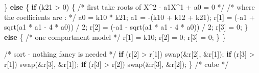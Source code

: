 \documentclass[
  letterpaper,
  DIV=11,
  numbers=noendperiod]{scrartcl}
\newenvironment{Shaded}{\begin{snugshade}}{\end{snugshade}}
\newcommand{\CommentTok}[1]{\textcolor[rgb]{0.37,0.37,0.37}{#1}}
\newcommand{\ControlFlowTok}[1]{\textcolor[rgb]{0.00,0.23,0.31}{\textbf{#1}}}
\newcommand{\DecValTok}[1]{\textcolor[rgb]{0.68,0.00,0.00}{#1}}
\newcommand{\NormalTok}[1]{\textcolor[rgb]{0.00,0.23,0.31}{#1}}
\newcommand{\OperatorTok}[1]{\textcolor[rgb]{0.37,0.37,0.37}{#1}}
\begin{document}
\begin{Shaded}
\begin{Highlighting}[]
        \OperatorTok{\}}
    \ControlFlowTok{else}
        \OperatorTok{\{}
        \ControlFlowTok{if} \OperatorTok{(}\NormalTok{k21 }\OperatorTok{\textgreater{}} \DecValTok{0}\OperatorTok{)}
            \OperatorTok{\{}
            \CommentTok{/* first take roots of X\^{}2 {-} a1X\^{}1 + a0 = 0 */}
            \CommentTok{/* where the coefficients are : */}
\NormalTok{            a0 }\OperatorTok{=}\NormalTok{ k10 }\OperatorTok{*}\NormalTok{ k21}\OperatorTok{;}
\NormalTok{            a1 }\OperatorTok{=} \OperatorTok{{-}(}\NormalTok{k10 }\OperatorTok{+}\NormalTok{ k12 }\OperatorTok{+}\NormalTok{ k21}\OperatorTok{);}
\NormalTok{            r}\OperatorTok{[}\DecValTok{1}\OperatorTok{]} \OperatorTok{=} \OperatorTok{({-}}\NormalTok{a1 }\OperatorTok{+}\NormalTok{ sqrt}\OperatorTok{(}\NormalTok{a1 }\OperatorTok{*}\NormalTok{ a1 }\OperatorTok{{-}} \DecValTok{4} \OperatorTok{*}\NormalTok{ a0}\OperatorTok{))} \OperatorTok{/} \DecValTok{2}\OperatorTok{;}
\NormalTok{            r}\OperatorTok{[}\DecValTok{2}\OperatorTok{]} \OperatorTok{=} \OperatorTok{({-}}\NormalTok{a1 }\OperatorTok{{-}}\NormalTok{ sqrt}\OperatorTok{(}\NormalTok{a1 }\OperatorTok{*}\NormalTok{ a1 }\OperatorTok{{-}} \DecValTok{4} \OperatorTok{*}\NormalTok{ a0}\OperatorTok{))} \OperatorTok{/} \DecValTok{2}\OperatorTok{;}
\NormalTok{            r}\OperatorTok{[}\DecValTok{3}\OperatorTok{]} \OperatorTok{=} \DecValTok{0}\OperatorTok{;}
            \OperatorTok{\}}
        \ControlFlowTok{else}
            \OperatorTok{\{}
            \CommentTok{/* one compartment model */}
\NormalTok{            r}\OperatorTok{[}\DecValTok{1}\OperatorTok{]} \OperatorTok{=}\NormalTok{ k10}\OperatorTok{;}
\NormalTok{            r}\OperatorTok{[}\DecValTok{2}\OperatorTok{]} \OperatorTok{=} \DecValTok{0}\OperatorTok{;}
\NormalTok{            r}\OperatorTok{[}\DecValTok{3}\OperatorTok{]} \OperatorTok{=} \DecValTok{0}\OperatorTok{;}
            \OperatorTok{\}}
        \OperatorTok{\}}

    \CommentTok{/* sort {-} nothing fancy is needed */}
    \ControlFlowTok{if} \OperatorTok{(}\NormalTok{r}\OperatorTok{[}\DecValTok{2}\OperatorTok{]} \OperatorTok{\textgreater{}}\NormalTok{ r}\OperatorTok{[}\DecValTok{1}\OperatorTok{])}
\NormalTok{        swap}\OperatorTok{(\&}\NormalTok{r}\OperatorTok{[}\DecValTok{2}\OperatorTok{],} \OperatorTok{\&}\NormalTok{r}\OperatorTok{[}\DecValTok{1}\OperatorTok{]);}
    \ControlFlowTok{if} \OperatorTok{(}\NormalTok{r}\OperatorTok{[}\DecValTok{3}\OperatorTok{]} \OperatorTok{\textgreater{}}\NormalTok{ r}\OperatorTok{[}\DecValTok{1}\OperatorTok{])}
\NormalTok{        swap}\OperatorTok{(\&}\NormalTok{r}\OperatorTok{[}\DecValTok{3}\OperatorTok{],} \OperatorTok{\&}\NormalTok{r}\OperatorTok{[}\DecValTok{1}\OperatorTok{]);}
    \ControlFlowTok{if} \OperatorTok{(}\NormalTok{r}\OperatorTok{[}\DecValTok{3}\OperatorTok{]} \OperatorTok{\textgreater{}}\NormalTok{ r}\OperatorTok{[}\DecValTok{2}\OperatorTok{])}
\NormalTok{        swap}\OperatorTok{(\&}\NormalTok{r}\OperatorTok{[}\DecValTok{3}\OperatorTok{],} \OperatorTok{\&}\NormalTok{r}\OperatorTok{[}\DecValTok{2}\OperatorTok{]);}
    \OperatorTok{\}}                   \CommentTok{/* cube */}
\end{Highlighting}
\end{Shaded}
\end{document}
